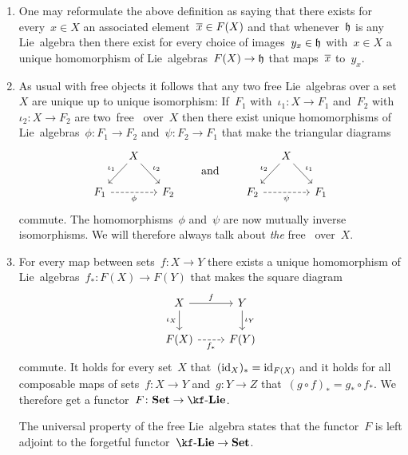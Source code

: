 \begin{remark}
  \leavevmode
  \begin{enumerate}
    \item
      One may reformulate the above definition as saying that there exists for every~$x \in X$ an associated element~$\overline{x} \in F(X)$ and that whenever~$\mathfrak{h}$ is any Lie~algebra then there exist for every choice of images~$y_x \in \mathfrak{h}$ with~$x \in X$ a unique homomorphism of Lie~algebras~$F(X) \to \hlie$ that maps~$\overline{x}$ to~$y_x$.
    \item
      As usual with free objects it follows that any two free Lie~algebras over a set~$X$ are unique up to unique isomorphism:
      If~$F_1$ with~$\iota_1 \colon X \to F_1$ and~$F_2$ with~$\iota_2 \colon X \to F_2$ are two~free~{\liealgebras{$\kf$}} over~$X$ then there exist unique homomorphisms of Lie~algebras~$\phi \colon F_1 \to F_2$ and~$\psi \colon F_2 \to F_1$ that make the triangular diagrams
      \[
        \begin{tikzcd}[column sep = small]
          {}
          &
          X
          \arrow{dl}[above left]{\iota_1}
          \arrow{dr}[above right]{\iota_2}
          &
          {}
          \\
          F_1
          \arrow[dashed]{rr}[below]{\phi}
          &
          {}
          &
          F_2
        \end{tikzcd}
        \qquad\text{and}\qquad
        \begin{tikzcd}[column sep = small]
          {}
          &
          X
          \arrow{dl}[above left]{\iota_2}
          \arrow{dr}[above right]{\iota_1}
          &
          {}
          \\
          F_2
          \arrow[dashed]{rr}[below]{\psi}
          &
          {}
          &
          F_1
        \end{tikzcd}
      \]
      commute.
      The homomorphisms~$\phi$ and~$\psi$ are now mutually inverse isomorphisms.
      We will therefore always talk about \emph{the} free~{\liealgebra{$\kf$}} over~$X$.
    \item
      For every map between sets~$f \colon X \to Y$ there exists a unique homomorphism of Lie~algebras~$f_* \colon F(X) \to F(Y)$ that makes the square diagram
      \[
        \begin{tikzcd}
          X
          \arrow{r}[above]{f}
          \arrow{d}[left]{\iota_X}
          &
          Y
          \arrow{d}[right]{\iota_Y}
          \\
          F(X)
          \arrow[dashed]{r}[below]{f_*}
          &
          F(Y)
        \end{tikzcd}
      \]
      commute.
      It holds for every set~$X$ that~$(\mathrm{id}_X)_* = \mathrm{id}_{F(X)}$ and it holds for all composable maps of sets~$f \colon X \to Y$ and~$g \colon Y \to Z$ that~$(g \circ f)_* = g_* \circ f_*$.
      We therefore get a functor~$F \colon \cSet \to \cLie{\kf}$.
      
      The universal property of the free Lie~algebra states that the functor~$F$ is left adjoint to the forgetful functor~$\cLie{\kf} \to \cSet$.
  \end{enumerate}
\end{remark}


